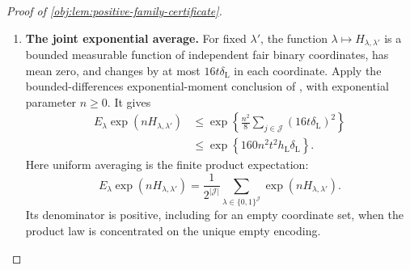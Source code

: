 \begin{proof}[Proof of \cref{obj:lem:positive-family-certificate}]
\begin{enumerate}
To count the coordinates, the strict intersection conditions defining
\(\mathcal J\) imply
\[
\frac{x_0-h_{\mathrm L}}{\delta_{\mathrm L}}<j+1,
\qquad
j-1<\frac{x_0+h_{\mathrm L}}{\delta_{\mathrm L}}.
\]
Taking integer bounds yields
\[
\mathcal J\subset
\left[
\left\lfloor\frac{x_0-h_{\mathrm L}}{\delta_{\mathrm L}}\right\rfloor,
\left\lceil\frac{x_0+h_{\mathrm L}}{\delta_{\mathrm L}}\right\rceil
\right]\cap\mathbb Z.
\]
Counting this integer interval and using the floor and ceiling bounds,
\[
\begin{aligned}
|\mathcal J|
&\le
\left\lceil\frac{x_0+h_{\mathrm L}}{\delta_{\mathrm L}}\right\rceil
-\left\lfloor\frac{x_0-h_{\mathrm L}}{\delta_{\mathrm L}}\right\rfloor+1\\
&\le\frac{2h_{\mathrm L}}{\delta_{\mathrm L}}+3
\le\frac{5h_{\mathrm L}}{\delta_{\mathrm L}}.
\end{aligned}
\]
The last inequality uses
\(0<\delta_{\mathrm L}=h_{\mathrm L}^5\le h_{\mathrm L}\).
Thus the squared coordinate-change budget satisfies
\[
\begin{aligned}
\sum_{j\in\mathcal J}(16t\delta_{\mathrm L})^2
&=|\mathcal J|(16t\delta_{\mathrm L})^2\\
&\le\frac{5h_{\mathrm L}}{\delta_{\mathrm L}}
                  (16t\delta_{\mathrm L})^2
=1280t^2h_{\mathrm L}\delta_{\mathrm L}.
\end{aligned}
\]

\item \textbf{The joint exponential average.}
For fixed \(\lambda'\), the function
\(\lambda\mapsto H_{\lambda,\lambda'}\) is a bounded measurable
function of independent fair binary coordinates, has mean zero,
and changes by at most \(16t\delta_{\mathrm L}\) in each coordinate.
Apply the bounded-differences exponential-moment conclusion of
\citep[Theorem~6.2, displayed log-mgf bound in its proof,
p.~167]{BoucheronLugosiMassart2013}, with exponential parameter
\(n\ge0\). It gives
\[
\begin{aligned}
E_\lambda\exp(nH_{\lambda,\lambda'})
&\le
\exp\!\left\{\frac{n^2}{8}
       \sum_{j\in\mathcal J}(16t\delta_{\mathrm L})^2\right\}\\
&\le\exp\!\left\{160n^2t^2h_{\mathrm L}\delta_{\mathrm L}\right\}.
\end{aligned}
\]
Here uniform averaging is the finite product expectation:
\[
E_\lambda\exp(nH_{\lambda,\lambda'})
=\frac1{2^{|\mathcal J|}}
  \sum_{\lambda\in\{0,1\}^{\mathcal J}}\exp(nH_{\lambda,\lambda'}).
\]
Its denominator is positive, including for an empty coordinate set,
when the product law is concentrated on the unique empty encoding.


\end{enumerate}
\end{proof}
